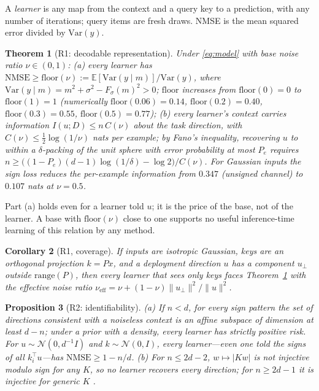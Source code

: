 \documentclass{article}
\newtheorem{theorem}{Theorem}
\newtheorem{proposition}[theorem]{Proposition}
\newtheorem{corollary}[theorem]{Corollary}
\theoremstyle{definition}
\theoremstyle{remark}
\newcommand{\Fsig}{F_{\sigma}}
\newcommand{\Ex}{\mathbb{E}}
\newcommand{\flr}{\mathrm{floor}}
\begin{document}
A \emph{learner} is any map from the context and a query key to a prediction, with any number of iterations; query items are fresh draws.
NMSE is the mean squared error divided by $\mathrm{Var}(y)$.

\begin{theorem}[R1: decodable representation]
\label{thm:b1}
Under \eqref{eq:model} with base noise ratio $\nu\in(0,1)$:
(a) every learner has $\mathrm{NMSE}\geq\flr(\nu):=\Ex[\mathrm{Var}(y\mid m)]/\mathrm{Var}(y)$, where $\mathrm{Var}(y\mid m)=m^2+\sigma^2-\Fsig(m)^2>0$; $\flr$ increases from $\flr(0)=0$ to $\flr(1)=1$ (numerically $\flr(0.06)=0.14$, $\flr(0.2)=0.40$, $\flr(0.3)=0.55$, $\flr(0.5)=0.77$);
(b) every learner's context carries information $I(u;D)\leq n\,C(\nu)$ about the task direction, with $C(\nu)\leq\tfrac12\log(1/\nu)$ nats per example; by Fano's inequality, recovering $u$ to within a $\delta$-packing of the unit sphere with error probability at most $P_e$ requires $n\geq\big((1-P_e)(d-1)\log(1/\delta)-\log2\big)/C(\nu)$.
For Gaussian inputs the sign loss reduces the per-example information from $0.347$ (unsigned channel) to $0.107$ nats at $\nu=0.5$.
\end{theorem}

Part (a) holds even for a learner told $u$; it is the price of the base, not of the learner.
A base with $\flr(\nu)$ close to one supports no useful inference-time learning of this relation by any method.

\begin{corollary}[R1, coverage]
\label{cor:b2}
If inputs are isotropic Gaussian, keys are an orthogonal projection $k=Px$, and a deployment direction $u$ has a component $u_\perp$ outside $\mathrm{range}(P)$, then every learner that sees only keys faces Theorem~\ref{thm:b1} with the effective noise ratio $\nu_{\mathrm{eff}}=\nu+(1-\nu)\|u_\perp\|^2/\|u\|^2$.
\end{corollary}

\begin{proposition}[R2: identifiability]
\label{prop:b3}
(a) If $n<d$, for every sign pattern the set of directions consistent with a noiseless context is an affine subspace of dimension at least $d-n$; under a prior with a density, every learner has strictly positive risk. For $u\sim\mathcal N(0,d^{-1}I)$ and $k\sim\mathcal N(0,I)$, every learner---even one told the signs of all $k_i^\top u$---has $\mathrm{NMSE}\geq1-n/d$.
(b) For $n\leq2d-2$, $w\mapsto|Kw|$ is not injective modulo sign for any $K$, so no learner recovers every direction; for $n\geq2d-1$ it is injective for generic $K$ \citep{balan2006phase}.
\end{proposition}
\end{document}
